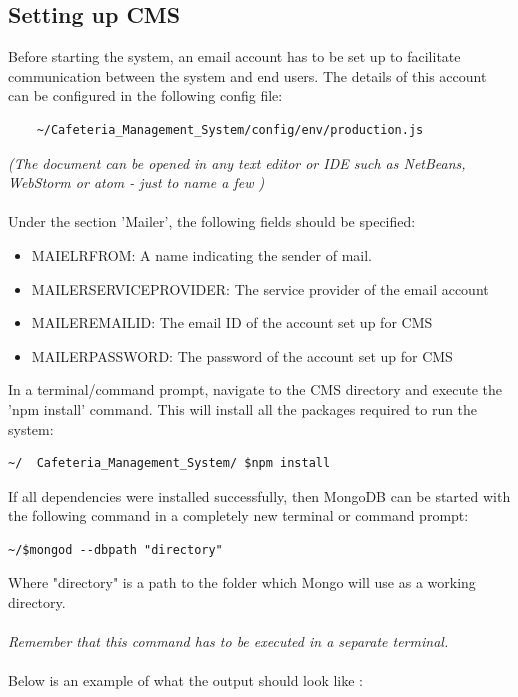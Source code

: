 \documentclass[a4paper,12pt]{article}
\begin{document}
\subsection{Setting up CMS}
Before starting the system, an email account has to be set up to facilitate communication between the system and end users. The details of this account can be configured in the following config file:
\begin{verbatim}
	~/Cafeteria_Management_System/config/env/production.js
\end{verbatim} 
{\em (The document can be opened in any text editor or IDE  such as NetBeans, WebStorm or atom - just to name a few )}
\\ \\
Under the section 'Mailer', the following fields should be specified:\\
\begin{itemize}
\item MAIELR\textunderscore FROM: A name indicating the sender of mail.
\item MAILER\textunderscore SERVICE\textunderscore PROVIDER: The service provider of the email account
\item MAILER\textunderscore EMAIL\textunderscore ID: The email ID of the account set up for CMS
\item MAILER\textunderscore PASSWORD: The password of the account set up for CMS
\end{itemize}


In a terminal/command prompt, navigate to the CMS directory and execute the 'npm install' command. This will install all the packages required to run the system: 


\begin{verbatim}
~/  Cafeteria_Management_System/ $npm install
\end{verbatim}

If all dependencies were installed successfully, then MongoDB can be started with the following command in a completely new terminal or command prompt:
\begin{verbatim}
~/$mongod --dbpath "directory"
\end{verbatim}

Where "directory"  is a path to the folder which Mongo will use as a working directory.\\ \\
{\em Remember that this command has to be executed in a separate terminal.}\\ \\
Below is an example of what the output should look like :
\end{document}
